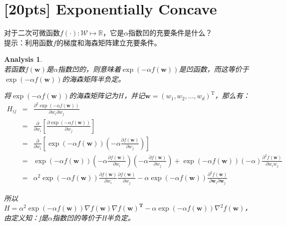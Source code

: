 \documentclass[a4paper,UTF8]{article}
\numberwithin{equation}{section}
\newtheorem*{myAnalysis}{Analysis}
\begin{document}
\section{[20pts] Exponentially Concave}
\noindent 对于二次可微函数$f(\cdot):\mathcal{W} \mapsto \mathbb{R}$，它是$\alpha$指数凹的充要条件是什么？\\
提示：利用函数$f$的梯度和海森矩阵建立充要条件。
\begin{myAnalysis}~\\
	
若函数$f(\mathbf{w})$是$\alpha$指数凹的，则意味着$\exp(-\alpha f(\mathbf{w}))$是凹函数，而这等价于$\exp(-\alpha f(\mathbf{w}))$的海森矩阵半负定。

将$\exp(-\alpha f(\mathbf{w}))$的海森矩阵记为$H$，并记$\mathbf{w} = (w_1, w_2, \ldots, w_d)^\mathrm{T}$，那么有：
\begin{eqnarray*}
H_{ij} &=& \frac{\partial^2 \exp(-\alpha f(\mathbf{w}))} { \partial w_i \partial w_j } \\
&=& \frac{\partial}{\partial w_i} \left[ \frac{\partial \exp(-\alpha f(\mathbf{w}))} { \partial w_j } \right] \\
&=& \frac{\partial}{\partial w_i} \left[ \exp(-\alpha f(\mathbf{w})) (-\alpha \frac{\partial f(\mathbf{w})}{\partial w_j}) \right] \\
&=& \exp(-\alpha f(\mathbf{w})) (-\alpha \frac{\partial f(\mathbf{w})}{\partial w_i}) (-\alpha \frac{\partial f(\mathbf{w})}{\partial w_j}) + \exp(-\alpha f(\mathbf{w})) (-\alpha) \frac{\partial^2f(\mathbf{w})}{\partial w_i w_j} \\
&=& \alpha^2 \exp(-\alpha f(\mathbf{w})) \frac{\partial f(\mathbf{w})}{\partial w_i} \frac{\partial f(\mathbf{w})}{\partial w_j} - \alpha \exp(-\alpha f(\mathbf{w})) \frac{\partial^2 f(\mathbf{w})}{\partial \mathbf{w}_i \partial \mathbf{w}_j}
\end{eqnarray*}

所以$H = \alpha^2 \exp(-\alpha f(\mathbf{w})) \nabla f(\mathbf{w}) \nabla f(\mathbf{w}) ^ \mathbf{T} - \alpha \exp(-\alpha f(\mathbf{w})) \nabla^2 f(\mathbf{w})$，由定义知：f是$\alpha$指数凹的等价于H半负定。

	~\\	
	~\\
\end{myAnalysis}

\newpage
\end{document}
